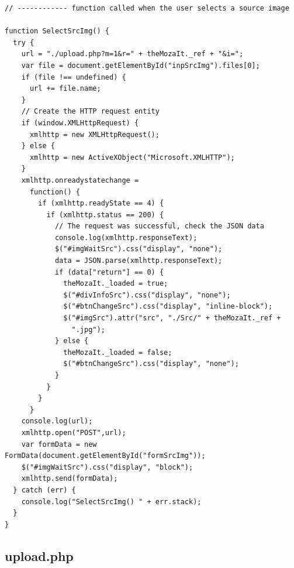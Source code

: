 \documentclass[12pt, a4paper]{article}
\begin{document}
\begin{scriptsize}
\begin{ttfamily}
\begin{lstlisting}
// ------------ function called when the user selects a source image

function SelectSrcImg() {
  try {
    url = "./upload.php?m=1&r=" + theMozaIt._ref + "&i=";
    var file = document.getElementById("inpSrcImg").files[0];
    if (file !== undefined) { 
      url += file.name;
    }
    // Create the HTTP request entity
    if (window.XMLHttpRequest) {
      xmlhttp = new XMLHttpRequest();
    } else {
      xmlhttp = new ActiveXObject("Microsoft.XMLHTTP");
    }
    xmlhttp.onreadystatechange = 
      function() {
        if (xmlhttp.readyState == 4) {
          if (xmlhttp.status == 200) {
            // The request was successful, check the JSON data
            console.log(xmlhttp.responseText);
            $("#imgWaitSrc").css("display", "none");
            data = JSON.parse(xmlhttp.responseText);
            if (data["return"] == 0) {
              theMozaIt._loaded = true;
              $("#divInfoSrc").css("display", "none");
              $("#btnChangeSrc").css("display", "inline-block");
              $("#imgSrc").attr("src", "./Src/" + theMozaIt._ref +
                ".jpg");
            } else {
              theMozaIt._loaded = false;
              $("#btnChangeSrc").css("display", "none");
            }
          }
        }
      }
    console.log(url);
    xmlhttp.open("POST",url);
    var formData = new FormData(document.getElementById("formSrcImg"));
    $("#imgWaitSrc").css("display", "block");
    xmlhttp.send(formData);
  } catch (err) {
    console.log("SelectSrcImg() " + err.stack);
  }
}
\end{lstlisting}
\end{ttfamily}
\end{scriptsize}

\subsection{upload.php}
\end{document}

